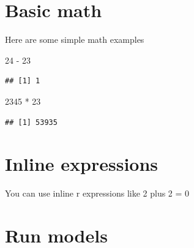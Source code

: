 \documentclass[11pt,report]{uncdissertation}
\newenvironment{Shaded}{\begin{snugshade}}{\end{snugshade}}
\newcommand{\KeywordTok}[1]{\textcolor[rgb]{0.13,0.29,0.53}{\textbf{{#1}}}}
\newcommand{\DataTypeTok}[1]{\textcolor[rgb]{0.13,0.29,0.53}{{#1}}}
\newcommand{\DecValTok}[1]{\textcolor[rgb]{0.00,0.00,0.81}{{#1}}}
\newcommand{\StringTok}[1]{\textcolor[rgb]{0.31,0.60,0.02}{{#1}}}
\newcommand{\OtherTok}[1]{\textcolor[rgb]{0.56,0.35,0.01}{{#1}}}
\newcommand{\NormalTok}[1]{{#1}}
\begin{document}
\section{Basic math}\label{basic-math}

Here are some simple math examples

\begin{Shaded}
\begin{Highlighting}[]
\DecValTok{24} \NormalTok{-}\StringTok{ }\DecValTok{23}
\end{Highlighting}
\end{Shaded}

\begin{verbatim}
## [1] 1
\end{verbatim}

\begin{Shaded}
\begin{Highlighting}[]
\DecValTok{2345} \NormalTok{*}\StringTok{ }\DecValTok{23}
\end{Highlighting}
\end{Shaded}

\begin{verbatim}
## [1] 53935
\end{verbatim}

\section{Inline expressions}\label{inline-expressions}

You can use inline r expressions like 2 plus 2 = 0

\section{Run models}\label{run-models}

\begin{Shaded}
\end{Shaded}
\end{document}
